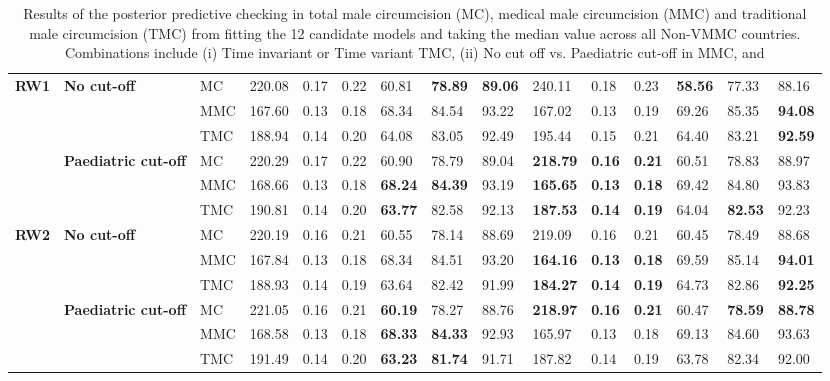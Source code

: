 \documentclass{article}
\begin{document}
\begin{landscape}
{\begin{table}[H]
\begin{tabular}{>{\bfseries}p{0.75cm} 
     >{\bfseries}p{3cm} p{1cm} C{1.25cm} 
     C{1.25cm} C{1.25cm} C{1.25cm} C{1.25cm} C{1.25cm} C{1.25cm} C{1.25cm} 
     C{1.25cm} C{1.25cm} C{1.25cm} C{1.25cm}}
 RW1 & No cut-off & MC & 220.08 &   0.17 &   0.22 &  60.81 & \bf 78.89 & \bf 89.06 & 240.11 &   0.18 &   0.23 & \bf 58.56 &  77.33 &  88.16 \\ 
  &  & MMC & 167.60 &   0.13 &   0.18 &  68.34 &  84.54 &  93.22 & 167.02 &   0.13 &   0.19 &  69.26 &  85.35 & \bf 94.08 \\ 
  &  & TMC & 188.94 &   0.14 &   0.20 &  64.08 &  83.05 &  92.49 & 195.44 &   0.15 &   0.21 &  64.40 &  83.21 & \bf 92.59 \\ 
  & Paediatric cut-off & MC & 220.29 &   0.17 &   0.22 &  60.90 &  78.79 &  89.04 & \bf218.79 & \bf  0.16 & \bf  0.21 &  60.51 &  78.83 &  88.97 \\ 
  &  & MMC & 168.66 &   0.13 &   0.18 & \bf 68.24 & \bf 84.39 &  93.19 & \bf165.65 & \bf  0.13 & \bf  0.18 &  69.42 &  84.80 &  93.83 \\ 
  &  & TMC & 190.81 &   0.14 &   0.20 & \bf 63.77 &  82.58 &  92.13 & \bf187.53 & \bf  0.14 & \bf  0.19 &  64.04 & \bf 82.53 &  92.23 \\ 
 RW2 & No cut-off & MC & 220.19 &   0.16 &   0.21 &  60.55 &  78.14 &  88.69 & 219.09 &   0.16 &   0.21 &  60.45 &  78.49 &  88.68 \\ 
  &  & MMC & 167.84 &   0.13 &   0.18 &  68.34 &  84.51 &  93.20 & \bf164.16 & \bf  0.13 & \bf  0.18 &  69.59 &  85.14 & \bf 94.01 \\ 
  &  & TMC & 188.93 &   0.14 &   0.19 &  63.64 &  82.42 &  91.99 & \bf184.27 & \bf  0.14 & \bf  0.19 &  64.73 &  82.86 & \bf 92.25 \\ 
  & Paediatric cut-off & MC & 221.05 &   0.16 &   0.21 & \bf 60.19 &  78.27 &  88.76 & \bf218.97 & \bf  0.16 & \bf  0.21 &  60.47 & \bf 78.59 & \bf 88.78 \\ 
  &  & MMC & 168.58 &   0.13 &   0.18 & \bf 68.33 & \bf 84.33 &  92.93 & 165.97 &   0.13 &   0.18 &  69.13 &  84.60 &  93.63 \\ 
  &  & TMC & 191.49 &   0.14 &   0.20 & \bf 63.23 & \bf 81.74 &  91.71 & 187.82 &   0.14 &   0.19 &  63.78 &  82.34 &  92.00 \\ 
  \hline 
  \end{tabular} 
  \caption{Results of the posterior predictive checking in total 
             male circumcision (MC), medical male circumcision (MMC) and 
             traditional male circumcision (TMC) from fitting the 12 candidate 
             models and taking the median value across all Non-VMMC countries. Combinations include 
             (i) Time invariant or Time variant TMC, 
             (ii) No cut off vs. Paediatric cut-off in MMC, and 
}
\end{table}}
\end{landscape}
\end{document}
